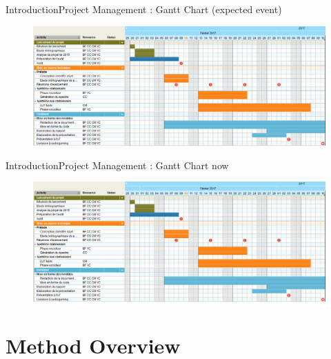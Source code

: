 \documentclass{bredelebeamer}
\begin{document}
\begin{frame}{Introduction}{Project Management : Gantt Chart (expected event)}

\begin{figure}
	\centerline{\includegraphics[scale=0.28]{Gantt.png}}
\end{figure}
\end{frame}

\begin{frame}{Introduction}{Project Management : Gantt Chart now}

\begin{figure}
	\centerline{\includegraphics[scale=0.28]{Gantt.png}}
\end{figure}
\end{frame}

\section{Method Overview}
\end{document}
